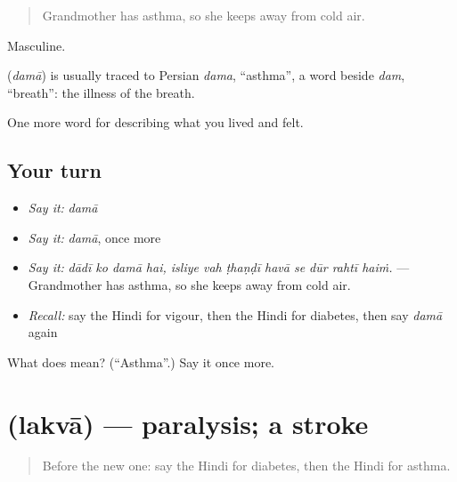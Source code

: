 \begin{quote}
Grandmother has asthma, so she keeps away from cold air.
\end{quote}

Masculine.

\begin{cousinweb}
\textbf{} (\emph{damā}) is usually traced to Persian \emph{dama}, \textquotedblleft{}asthma\textquotedblright{}, a word beside \emph{dam}, \textquotedblleft{}breath\textquotedblright{}: the illness of the breath.
\end{cousinweb}

\begin{grammarlens}[title={What you've built}]
One more word for describing what you lived and felt.
\end{grammarlens}

\subsection*{Your turn}
\begin{itemize}
\raggedright
  \item \emph{Say it:} \emph{damā}
  \item \emph{Say it:} \emph{damā}, once more
  \item \emph{Say it:} \emph{dādī ko damā hai, isliye vah ṭhaṇḍī havā se dūr rahtī haiṁ.} — Grandmother has asthma, so she keeps away from cold air.
  \item \emph{Recall:} say the Hindi for vigour, then the Hindi for diabetes, then say \emph{damā} again
\end{itemize}

\begin{tcolorbox}[breakable,colback=teal!4,colframe=teal!35!black,title={Before you move on}]
What does  mean? (\textquotedblleft{}Asthma\textquotedblright{}.) Say it once more.
\end{tcolorbox}
\section[\texorpdfstring{\hi{लकवा} (lakvā)}{लकवा (lakvā)}]{ (lakvā) — paralysis; a stroke}

\label{lesson:HI-C493-lakva}



\begin{quote}
Before the new one: say the Hindi for diabetes, then the Hindi for asthma.
\end{quote}

